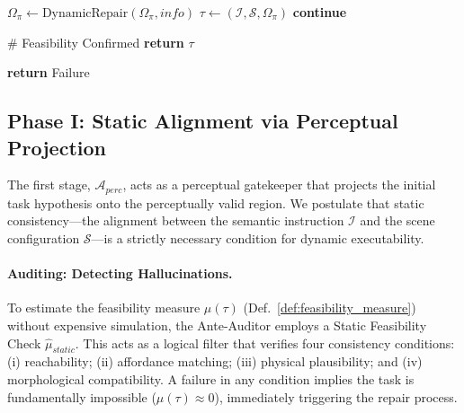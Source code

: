 \documentclass{article}
\theoremstyle{plain}
\theoremstyle{definition}
\theoremstyle{remark}
\begin{document}
\begin{algorithm}[h]
\begin{algorithmic}[1]
           \STATE {}
           \STATE $\Omega_{\pi} \leftarrow \text{DynamicRepair}(\Omega_{\pi}, info)$
           \STATE $\tau \leftarrow (\mathcal{I}, \mathcal{S}, \Omega_{\pi})$
           \STATE \textbf{continue} 
       \ENDIF
       
       \vspace{0.2em}
       \STATE \textcolor{green!50!black}{\# Feasibility Confirmed}
       \STATE \textbf{return} $\tau$ 
       
   \ENDFOR
   
   \STATE \textbf{return} Failure
\end{algorithmic}
\end{algorithm}

\subsection{Phase I: Static Alignment via Perceptual Projection}
\label{subsec:static_alignment}

The first stage, $\mathcal{A}_{perc}$, acts as a perceptual gatekeeper that projects the initial task hypothesis onto the perceptually valid region. We postulate that static consistency—the alignment between the semantic instruction $\mathcal{I}$ and the scene configuration $\mathcal{S}$—is a strictly necessary condition for dynamic executability.

\paragraph{Auditing: Detecting Hallucinations.}
To estimate the feasibility measure $\mu(\tau)$ (Def.~\ref{def:feasibility_measure}) without expensive simulation, the Ante-Auditor employs a Static Feasibility Check $\hat{\mu}_{static}$. This acts as a logical filter that verifies four consistency conditions: (i) reachability; (ii) affordance matching; (iii) physical plausibility; and (iv) morphological compatibility. A failure in any condition implies the task is fundamentally impossible ($\mu(\tau) \approx 0$), immediately triggering the repair process.
\end{document}
